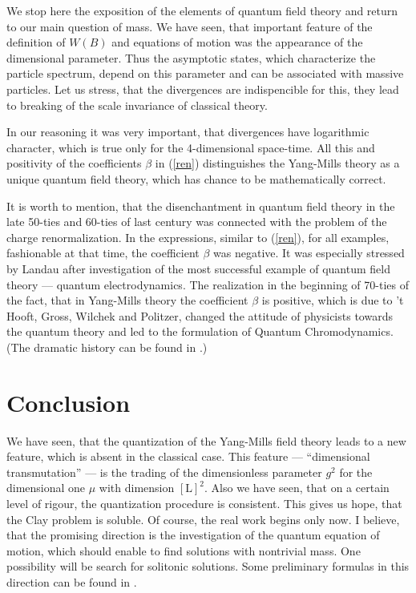 \documentclass[12pt]{article}
\begin{document}
	We stop here the exposition of the elements of quantum field 
	theory and return to our main question of mass.
	We have seen, that important feature of the definition of
    $ W(B) $
	and equations of motion was the appearance of the
	dimensional parameter.
	Thus the asymptotic states, which characterize the particle 
	spectrum, depend on this parameter and can be associated
	with massive particles.
	Let us stress, that the divergences are
	indispencible for this,
	they lead to breaking of the scale invariance
	of classical theory.

	In our reasoning it was very important, that divergences have 
	logarithmic character, which is true only for the 4-dimensional 
	space-time.
	All this and positivity of the coefficients
    $ \beta $
	in
(\ref{ren})
	distinguishes the Yang-Mills theory as a unique quantum field
	theory, which has chance to be mathematically correct.

	It is worth to mention, that the disenchantment in quantum
	field theory in the late 50-ties and 60-ties of last century
	was connected with the problem of the charge renormalization.
	In the expressions, similar to
(\ref{ren}),
	for all examples, fashionable at that time, the coefficient
    $ \beta $
	was negative.
	It was especially stressed by Landau after investigation
	of the most successful example of quantum field theory ---
	quantum electrodynamics.
	The realization in the beginning of 70-ties of the fact,
	that in Yang-Mills theory the coefficient
    $ \beta $
	is positive, which is due to 't Hooft, Gross, Wilchek and Politzer,
	changed the attitude of physicists towards the quantum theory
	and led to the formulation of Quantum Chromodynamics.
	(The dramatic history can be found in
\cite{Gross}.)

\section*{Conclusion}
	We have seen, that the quantization of the Yang-Mills field 
	theory leads to a new feature, which is absent in the classical
	case.
	This feature ---
	``dimensional transmutation'' --- is the trading of the 
	dimensionless parameter
    $ g^{2} $
	for the dimensional one
    $ \mu $
	with dimension
    $ [\text{L}]^{2} $.
	Also we have seen, that on a certain level of rigour, 
	the quantization procedure is consistent.
	This gives us hope, that the Clay problem is soluble.
	Of course, the real work begins only now.
	I believe, that the promising direction is the investigation
	of the quantum equation of motion, which should enable to find
	solutions with nontrivial mass.
	One possibility will be search for solitonic solutions.
	Some preliminary formulas in this direction can be found in
\cite{FN}.
\end{document}
